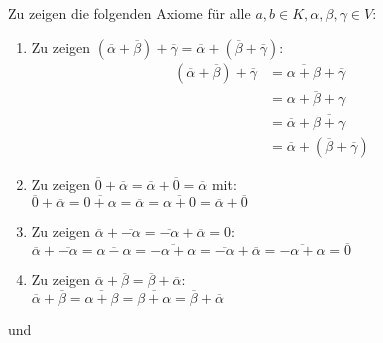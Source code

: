 \documentclass[sectionformat = aufgabe]{gadsescript}
\begin{document}
\subsection{}
Zu zeigen die folgenden Axiome für alle $ a, b \in K, \alpha, \beta, \gamma \in V $:
\begin{enumerate}[label=(V\arabic*)]
	\item Zu zeigen $ \left( \overline{\alpha} + \overline{\beta}  \right) + \overline{\gamma} = \overline{\alpha} + \left( \overline{\beta} + \overline{\gamma}  \right)   $:
		\begin{align*}
			\left( \overline{\alpha} + \overline{\beta} \right) + \overline{\gamma}
				&= \overline{\alpha + \beta} + \overline{\gamma} \\
				&= \overline{\alpha + \beta + \gamma}  \\
				&= \overline{\alpha} + \overline{\beta + \gamma}  \\
				&= \overline{\alpha} + \left( \overline{\beta} + \overline{\gamma} \right)
		\end{align*}
	\item Zu zeigen $ \overline{0}  + \overline{\alpha} = \overline{\alpha} + \overline{0}  = \overline{\alpha} $ mit:\\
		$ \overline{0} + \overline{\alpha} = \overline{0 + \alpha} = \overline{\alpha} = \overline{\alpha + 0} = \overline{\alpha} + \overline{0} $
	\item Zu zeigen $ \overline{\alpha} + \overline{-\alpha} = \overline{-\alpha} + \overline{\alpha} = 0 $:\\
		$ \overline{\alpha} + \overline{-\alpha} = \overline{\alpha - \alpha} = \overline{-\alpha + \alpha} = \overline{-\alpha} + \overline{\alpha} = \overline{-\alpha + \alpha} = \overline{0} $
	\item Zu zeigen $ \overline{\alpha} + \overline{\beta} = \overline{\beta} + \overline{\alpha} $:\\
		$ \overline{\alpha} + \overline{\beta} = \overline{\alpha + \beta} = \overline{\beta + \alpha} = \overline{\beta} + \overline{\alpha}  $
\end{enumerate}
und
\end{document}
